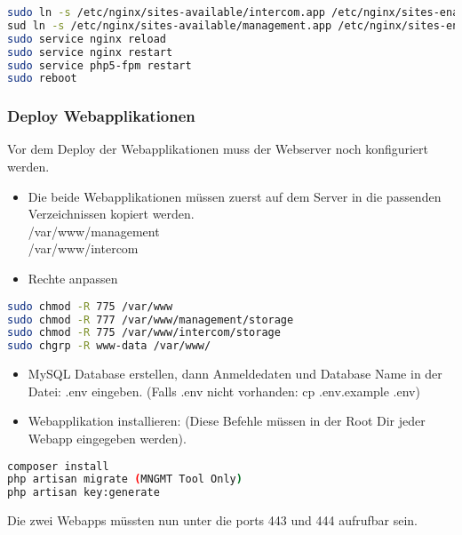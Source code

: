 \begin{lstlisting}[backgroundcolor = \color{snippetcolor},
language = bash,
xleftmargin = 0.5cm,
framexleftmargin = 0.1em,
breaklines=true]
sudo ln -s /etc/nginx/sites-available/intercom.app /etc/nginx/sites-enabled/
sud ln -s /etc/nginx/sites-available/management.app /etc/nginx/sites-enabled/
sudo service nginx reload
sudo service nginx restart
sudo service php5-fpm restart
sudo reboot

\end{lstlisting}

\subsubsection{Deploy Webapplikationen}
Vor dem Deploy der Webapplikationen muss der Webserver noch konfiguriert werden.
\\
\begin{itemize}
	\item Die beide Webapplikationen müssen zuerst auf dem Server in die passenden Verzeichnissen kopiert werden.\\
		/var/www/management\\
		/var/www/intercom
	\item Rechte anpassen
\end{itemize}

\begin{lstlisting}[backgroundcolor = \color{snippetcolor},
language = bash,
xleftmargin = 0.5cm,
framexleftmargin = 0.1em,
breaklines=true]
sudo chmod -R 775 /var/www
sudo chmod -R 777 /var/www/management/storage
sudo chmod -R 775 /var/www/intercom/storage
sudo chgrp -R www-data /var/www/
\end{lstlisting}

\begin{itemize}
	\item MySQL Database erstellen, dann Anmeldedaten und Database Name in der Datei: .env eingeben. (Falls .env nicht vorhanden: cp .env.example .env)
	\item Webapplikation installieren: (Diese Befehle müssen in der Root Dir jeder Webapp eingegeben werden).
\end{itemize}

\begin{lstlisting}[backgroundcolor = \color{snippetcolor},
language = bash,
xleftmargin = 0.5cm,
framexleftmargin = 0.1em,
breaklines=true]
composer install
php artisan migrate (MNGMT Tool Only)
php artisan key:generate
\end{lstlisting}
Die zwei Webapps müssten nun unter die ports 443 und 444 aufrufbar sein.

